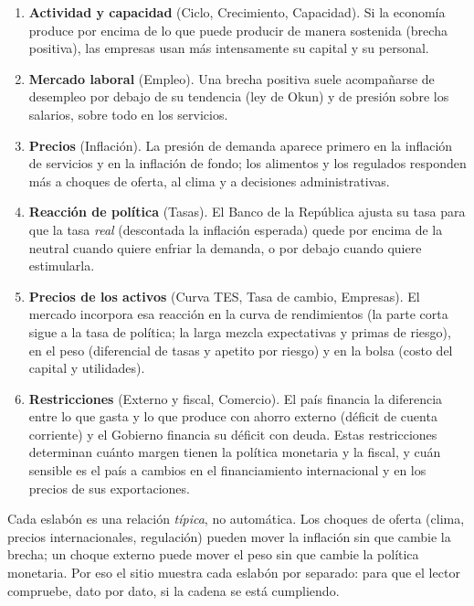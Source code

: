 \begin{enumerate}
\item \textbf{Actividad y capacidad} (Ciclo, Crecimiento, Capacidad). Si la economía produce por encima de lo que
  puede producir de manera sostenida (brecha positiva), las empresas usan más intensamente su capital y su personal.
\item \textbf{Mercado laboral} (Empleo). Una brecha positiva suele acompañarse de desempleo por debajo de su
  tendencia (ley de Okun) y de presión sobre los salarios, sobre todo en los servicios.
\item \textbf{Precios} (Inflación). La presión de demanda aparece primero en la inflación de servicios y en la
  inflación de fondo; los alimentos y los regulados responden más a choques de oferta, al clima y a decisiones
  administrativas.
\item \textbf{Reacción de política} (Tasas). El Banco de la República ajusta su tasa para que la tasa \emph{real}
  (descontada la inflación esperada) quede por encima de la neutral cuando quiere enfriar la demanda, o por debajo
  cuando quiere estimularla.
\item \textbf{Precios de los activos} (Curva TES, Tasa de cambio, Empresas). El mercado incorpora esa reacción en
  la curva de rendimientos (la parte corta sigue a la tasa de política; la larga mezcla expectativas y primas de
  riesgo), en el peso (diferencial de tasas y apetito por riesgo) y en la bolsa (costo del capital y utilidades).
\item \textbf{Restricciones} (Externo y fiscal, Comercio). El país financia la diferencia entre lo que gasta y lo que
  produce con ahorro externo (déficit de cuenta corriente) y el Gobierno financia su déficit con deuda. Estas
  restricciones determinan cuánto margen tienen la política monetaria y la fiscal, y cuán sensible es el país a
  cambios en el financiamiento internacional y en los precios de sus exportaciones.
\end{enumerate}

\begin{leer}
Cada eslabón es una relación \emph{típica}, no automática. Los choques de oferta (clima, precios internacionales,
regulación) pueden mover la inflación sin que cambie la brecha; un choque externo puede mover el peso sin que
cambie la política monetaria. Por eso el sitio muestra cada eslabón por separado: para que el lector compruebe,
dato por dato, si la cadena se está cumpliendo.
\end{leer}

